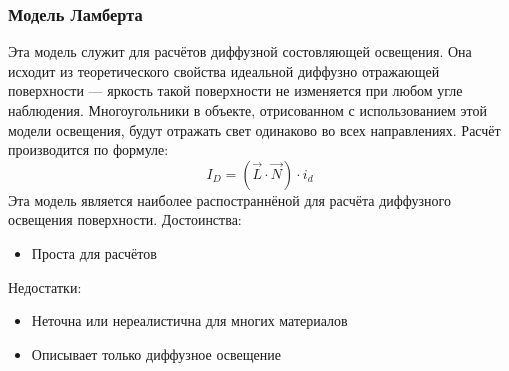 \documentclass[a4paper,12pt]{report}
\numberwithin{equation}{section}
\begin{document}
\subsubsection*{Модель Ламберта}
Эта модель \cite{angel2006interactive} служит для расчётов диффузной состовляющей освещения. Она исходит из теоретического свойства идеальной диффузно отражающей поверхности --- яркость такой поверхности не изменяется при любом угле наблюдения. Многоугольники в объекте, отрисованном с использованием этой модели освещения, будут отражать свет одинаково во всех направлениях. Расчёт производится по формуле:
\begin{equation}
I_D = (\vec{L} \cdot \vec{N}) \cdot i_d
\end{equation}
Эта модель является наиболее распостраннёной для расчёта диффузного освещения поверхности.
Достоинства:
\begin{itemize}
\item Проста для расчётов
\end{itemize}
Недостатки:
\begin{itemize}
\item Неточна или нереалистична для многих материалов
\item Описывает только диффузное освещение
\end{itemize}
\end{document}
